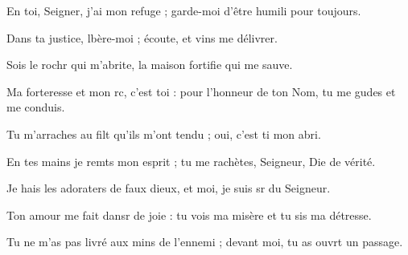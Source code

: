 \item En toi, Seigner, j’ai mon refuge ;\psstar{} garde-moi d’être humili pour toujours.
\item Dans ta justice, lbère-moi ;\psstar{} écoute, et vins me délivrer.
\item Sois le rochr qui m’abrite,\psstar{} la maison fortifie qui me sauve.
\item Ma forteresse et mon rc, c’est toi :\psstar{} pour l’honneur de ton Nom, tu me gudes et me conduis.
\item Tu m’arraches au filt qu’ils m’ont tendu ;\psstar{} oui, c’est ti mon abri.
\item En tes mains je remts mon esprit ;\psstar{} tu me rachètes, Seigneur, Die de vérité.
\item Je hais les adoraters de faux dieux,\psstar{} et moi, je suis sr du Seigneur.
\item Ton amour me fait dansr de joie : tu vois ma misère et tu sis ma détresse.
\item Tu ne m’as pas livré aux mins de l’ennemi ;\psstar{} devant moi, tu as ouvrt un passage.